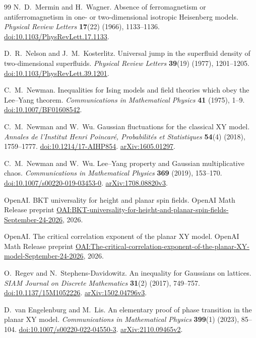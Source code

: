 \begin{thebibliography}{99}
N.~D.~Mermin and H.~Wagner.
Absence of ferromagnetism or antiferromagnetism in one- or
two-dimensional isotropic Heisenberg models.
\emph{Physical Review Letters} \textbf{17}(22) (1966), 1133--1136.
\href{https://doi.org/10.1103/PhysRevLett.17.1133}
{doi:10.1103/PhysRevLett.17.1133}.

D.~R.~Nelson and J.~M.~Kosterlitz.
Universal jump in the superfluid density of two-dimensional superfluids.
\emph{Physical Review Letters} \textbf{39}(19) (1977), 1201--1205.
\href{https://doi.org/10.1103/PhysRevLett.39.1201}
{doi:10.1103/PhysRevLett.39.1201}.

C.~M.~Newman.
Inequalities for Ising models and field theories which obey the
Lee--Yang theorem.
\emph{Communications in Mathematical Physics}
\textbf{41} (1975), 1--9.
\href{https://doi.org/10.1007/BF01608542}
{doi:10.1007/BF01608542}.

C.~M.~Newman and W.~Wu.
Gaussian fluctuations for the classical XY model.
\emph{Annales de l'Institut Henri Poincar\'e, Probabilit\'es et Statistiques}
\textbf{54}(4) (2018), 1759--1777.
\href{https://doi.org/10.1214/17-AIHP854}
{doi:10.1214/17-AIHP854}.
\href{https://arxiv.org/abs/1605.01297}{arXiv:1605.01297}.

C.~M.~Newman and W.~Wu.
Lee--Yang property and Gaussian multiplicative chaos.
\emph{Communications in Mathematical Physics}
\textbf{369} (2019), 153--170.
\href{https://doi.org/10.1007/s00220-019-03453-0}
{doi:10.1007/s00220-019-03453-0}.
\href{https://arxiv.org/abs/1708.08820v3}{arXiv:1708.08820v3}.

OpenAI.
BKT universality for height and planar spin fields.
OpenAI Math Release preprint
\href{https://github.com/openai/math/blob/main/preprints/BKT-universality-for-height-and-planar-spin-fields-September-24-2026/paper.pdf}{OAI:BKT-universality-for-height-and-planar-spin-fields-September-24-2026},
2026.

OpenAI.
The critical correlation exponent of the planar XY model.
OpenAI Math Release preprint
\href{https://github.com/openai/math/blob/main/preprints/The-critical-correlation-exponent-of-the-planar-XY-model-September-24-2026/paper.pdf}{OAI:The-critical-correlation-exponent-of-the-planar-XY-model-September-24-2026},
2026.

O.~Regev and N.~Stephens-Davidowitz.
An inequality for Gaussians on lattices.
\emph{SIAM Journal on Discrete Mathematics}
\textbf{31}(2) (2017), 749--757.
\href{https://doi.org/10.1137/15M1052226}
{doi:10.1137/15M1052226}.
\href{https://arxiv.org/abs/1502.04796v3}{arXiv:1502.04796v3}.

D.~van Engelenburg and M.~Lis.
An elementary proof of phase transition in the planar XY model.
\emph{Communications in Mathematical Physics}
\textbf{399}(1) (2023), 85--104.
\href{https://doi.org/10.1007/s00220-022-04550-3}
{doi:10.1007/s00220-022-04550-3}.
\href{https://arxiv.org/abs/2110.09465v2}{arXiv:2110.09465v2}.

\end{thebibliography}
